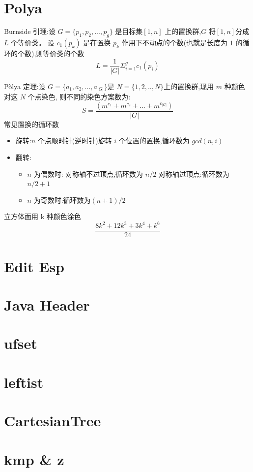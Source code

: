 \documentclass[
	10pt,
	twocolumn,
	a4paper,
]{article}
\begin{document}
\section{Polya}
Burnside 引理:设 $G = \{p_1, p_2, ..., p_g\}$ 是目标集$[1, n]$ 上的置换群,$G$ 将$[1, n]$分成 $L$ 个等价类。
设 $c_1(p_k)$ 是在置换 $p_k$ 作用下不动点的个数(也就是长度为 $1$ 的循环的个数),则等价类的个数
$$L = \frac{1}{|G|} \Sigma_{i=1}^{g}{c_1(p_i)}$$

Pòlya 定理:设 $G=\{a_1, a_2, ..., a_{|G|}\}$是 $N=\{1,2,..,N\}$上的置换群,现用 $m$ 种颜色对这 $N$ 个点染色, 则不同的染色方案数为:
$$S = \frac{(m^{c_1}+m^{c_2}+ \ldots + m^{c_{|G|}})}{|G|}$$
常见置换的循环数
\begin{itemize}
	\item 旋转:$n$ 个点顺时针(逆时针)旋转 $i$ 个位置的置换,循环数为 $gcd(n, i)$ 
	\item 翻转:
	\begin{itemize}
		\item $n$ 为偶数时: 对称轴不过顶点,循环数为 $n/2$ 对称轴过顶点:循环数为 $n/2+1$
		\item $n$ 为奇数时:循环数为$(n+1)/2$
	\end{itemize}
\end{itemize}
立方体面用 k 种颜色涂色
$$ \frac{8k^2 + 12 k^3 + 3 k^4 + k^6}{24} $$

\section{Edit Esp}

\section{Java Header}


\section{ufset}

\section{leftist}

\section{CartesianTree}

\section{kmp \& z}

%
\end{document}
